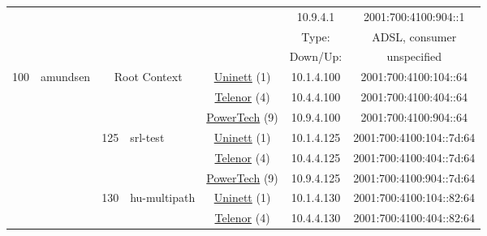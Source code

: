 \begin{small}
\begin{center}
\begin{longtable}{|c|c|c|c|c|c|c|c|}
  & \multicolumn{3}{|c|}{} & \multicolumn{2}{|c|}{} & \tiny{10.9.4.1} & \tiny{2001:700:4100:904::1} \\* \cline{7-7}\cline{8-8}
  & \multicolumn{3}{|c|}{} & \multicolumn{2}{|c|}{} & Type: & ADSL, consumer \\* \cline{7-7}\cline{8-8}
  & \multicolumn{3}{|c|}{} & \multicolumn{2}{|c|}{} & Down/Up:  & unspecified \\ \hline
 \multirow{27}{*}{\tiny{100}} & \multicolumn{1}{|l|}{\multirow{27}{*}{\tiny{amundsen}}} & \multicolumn{2}{|c|}{\multirow{3}{*}{\tiny{Root Context}}} & \multicolumn{2}{|c|}{\tiny{\href{https://www.uninett.no}{Uninett} (1)}} & \tiny{10.1.4.100} & \tiny{2001:700:4100:104::64} \\* \cline{5-5}\cline{6-6}\cline{7-7}\cline{8-8}
  &  & \multicolumn{2}{|c|}{} & \multicolumn{2}{|c|}{\tiny{\href{https://www.telenor.no}{Telenor} (4)}} & \tiny{10.4.4.100} & \tiny{2001:700:4100:404::64} \\* \cline{5-5}\cline{6-6}\cline{7-7}\cline{8-8}
  &  & \multicolumn{2}{|c|}{} & \multicolumn{2}{|c|}{\tiny{\href{http://www.powertech.no}{PowerTech} (9)}} & \tiny{10.9.4.100} & \tiny{2001:700:4100:904::64} \\* \cline{3-3}\cline{4-4}\cline{5-5}\cline{6-6}\cline{7-7}\cline{8-8}
  &  & \multirow{3}{*}{\tiny{125}} & \multicolumn{1}{|l|}{\multirow{3}{*}{\tiny{srl-test}}} & \multicolumn{2}{|c|}{\tiny{\href{https://www.uninett.no}{Uninett} (1)}} & \tiny{10.1.4.125} & \tiny{2001:700:4100:104::7d:64} \\* \cline{5-5}\cline{6-6}\cline{7-7}\cline{8-8}
  &  &  &  & \multicolumn{2}{|c|}{\tiny{\href{https://www.telenor.no}{Telenor} (4)}} & \tiny{10.4.4.125} & \tiny{2001:700:4100:404::7d:64} \\* \cline{5-5}\cline{6-6}\cline{7-7}\cline{8-8}
  &  &  &  & \multicolumn{2}{|c|}{\tiny{\href{http://www.powertech.no}{PowerTech} (9)}} & \tiny{10.9.4.125} & \tiny{2001:700:4100:904::7d:64} \\* \cline{3-3}\cline{4-4}\cline{5-5}\cline{6-6}\cline{7-7}\cline{8-8}
  &  & \multirow{3}{*}{\tiny{130}} & \multicolumn{1}{|l|}{\multirow{3}{*}{\tiny{hu-multipath}}} & \multicolumn{2}{|c|}{\tiny{\href{https://www.uninett.no}{Uninett} (1)}} & \tiny{10.1.4.130} & \tiny{2001:700:4100:104::82:64} \\* \cline{5-5}\cline{6-6}\cline{7-7}\cline{8-8}
  &  &  &  & \multicolumn{2}{|c|}{\tiny{\href{https://www.telenor.no}{Telenor} (4)}} & \tiny{10.4.4.130} & \tiny{2001:700:4100:404::82:64} \\* \cline{5-5}\cline{6-6}\cline{7-7}\cline{8-8}

\end{longtable}
\end{center}
\end{small}
